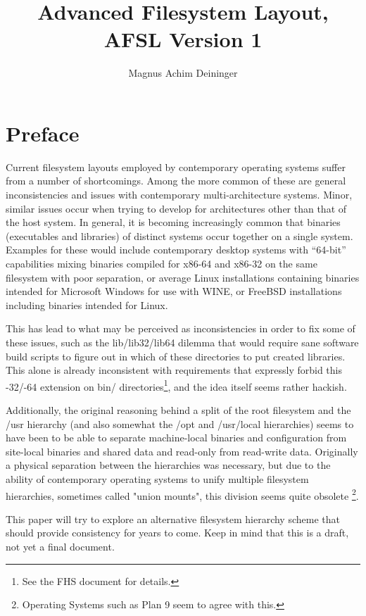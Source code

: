 \documentclass[a4paper,twoside,titlepage]{article}
\title{Advanced Filesystem Layout, AFSL Version 1}
\author{Magnus Achim Deininger}
\begin{document}
\maketitle
\tableofcontents

\newpage

\section*{Preface}
Current filesystem layouts employed by contemporary operating systems suffer
from a number of shortcomings. Among the more common of these are general
inconsistencies and issues with contemporary multi-architecture systems. Minor,
similar issues occur when trying to develop for architectures other than that of
the host system. In general, it is becoming increasingly common that binaries
(executables and libraries) of distinct systems occur together on a single
system. Examples for these would include contemporary desktop systems with
``64-bit'' capabilities mixing binaries compiled for x86-64 and x86-32 on the
same filesystem with poor separation, or average Linux installations containing
binaries intended for Microsoft Windows for use with WINE, or FreeBSD
installations including binaries intended for Linux.

This has lead to what may be perceived as inconsistencies in order to fix some
of these issues, such as the lib/lib32/lib64 dilemma that would require sane
software build scripts to figure out in which of these directories to put
created libraries. This alone is already inconsistent with requirements that
expressly forbid this -32/-64 extension on bin/ directories\footnote{See the FHS
document for details.}, and the idea itself seems rather hackish.

Additionally, the original reasoning behind a split of the root filesystem and
the /usr hierarchy (and also somewhat the /opt and /usr/local hierarchies) seems
to have been to be able to separate machine-local binaries and configuration
from site-local binaries and shared data and read-only from read-write data.
Originally a physical separation between the hierarchies was necessary, but due
to the ability of contemporary operating systems to unify multiple filesystem
hierarchies, sometimes called "union mounts", this division seems quite obsolete
\footnote{Operating Systems such as Plan 9 seem to agree with this.}.

This paper will try to explore an alternative filesystem hierarchy scheme that
should provide consistency for years to come. Keep in mind that this is a draft,
not yet a final document.
\end{document}
